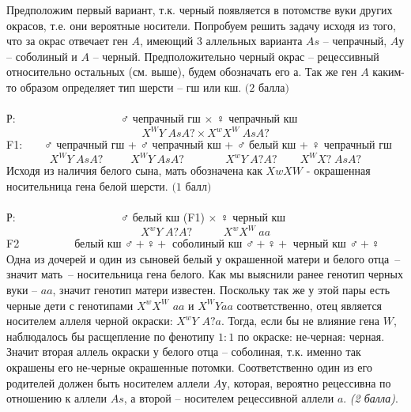 Предположим первый вариант, т.к. черный появляется в потомстве вуки других окрасов, т.е. они вероятные носители. Попробуем решить задачу исходя из того, что за окрас отвечает ген $A$, имеющий 3 аллельных варианта $As$ – чепрачный, $Aу$ – соболиный и $A$ – черный. Предположительно черный окрас – рецессивный относительно остальных (см. выше), будем обозначать его а. Так же ген $A$ каким-то образом определяет тип шерсти – гш или кш. $\textit{(2 балла)}$\\\\
Р:$\hspace{110pt}$ $\male$ чепрачный гш $\times$ $\female$ чепрачный кш
$$X^WY\hspace{3pt}AsA? \times X^wX^W\hspace{3pt}AsA?$$
F1:$\hspace{20pt}$ $\male$ чепрачный гш + $\male$ чепрачный кш + $\male$ белый кш + $\female$ чепрачный гш
$$X^WY\hspace{3pt}AsA?\hspace{30pt}X^WY\hspace{3pt}AsA?\hspace{10pt}\hspace{35pt}X^wY\hspace{3pt}A?A?\hspace{25pt}X^WX?\hspace{3pt}AsA?$$
Исходя из наличия белого сына, мать обозначена как $XwXW$  - окрашенная носительница гена белой шерсти. $\textit{(1 балл)}$\\\\
Р:$\hspace{110pt}$ $\male$ белый кш (F1) $\times$ $\female$ черный кш
$$X^wY\hspace{3pt}A?A?\hspace{34pt}X^wX^W\hspace{3pt}aa$$
F2$\hspace{60pt}$белый кш $\male+\female+$ соболиный кш $\male+\female+$ черный кш $\male+\female$\\

Одна из дочерей и один из сыновей белый у окрашенной матери и белого отца~– значит мать~– носительница гена белого. Как мы выяснили ранее генотип черных вуки – $aa$, значит генотип матери известен. Поскольку так же у этой пары есть черные дети с генотипами $X^wX^W$ $aa$ и $X^WYaa$ соответственно, отец является носителем аллеля черной окраски: $X^wY$ $A?a$. Тогда, если бы не влияние гена $W$, наблюдалось бы расщепление по фенотипу $1:1$ по окраске: не-черная: черная. Значит вторая аллель окраски у белого отца – соболиная, т.к. именно так окрашены его не-черные окрашенные потомки. Соответственно один из его родителей должен быть носителем аллели $Aу$, которая, вероятно рецессивна по отношению к аллели $As$, а второй – носителем рецессивной аллели $a$. \textit{(2 балла)}.

